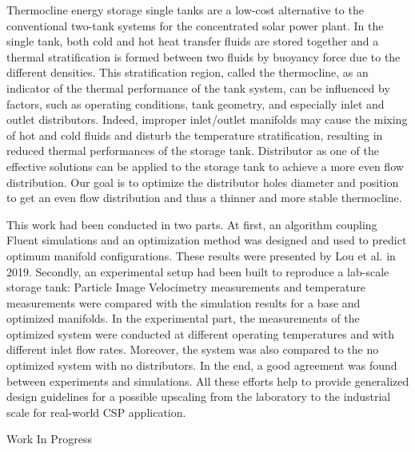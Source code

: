 {\normalsize
Thermocline energy storage single tanks are a low-cost alternative to the conventional two-tank systems for the concentrated solar power plant. In the single tank, both cold and hot heat transfer fluids are stored together and a thermal stratification is formed between two fluids by buoyancy force due to the different densities. This stratification region, called the thermocline, as an indicator of the thermal performance of the tank system, can be influenced by factors, such as operating conditions, tank geometry, and especially inlet and outlet distributors. Indeed, improper inlet/outlet manifolds may cause the mixing of hot and cold fluids and disturb the temperature stratification, resulting in reduced thermal performances of the storage tank. Distributor as one of the effective solutions can be applied to the storage tank to achieve a more even flow distribution. Our goal is to optimize the distributor holes diameter and position to get an even flow distribution and thus a thinner and more stable thermocline.



This work had been conducted in two parts. At first, an algorithm coupling Fluent simulations and an optimization method was designed and used to predict optimum manifold configurations. These results were presented by Lou et al. in 2019. Secondly, an experimental setup had been built to reproduce a lab-scale storage tank: Particle Image Velocimetry measurements and temperature measurements were compared with the simulation results for a base and optimized manifolds. In the experimental part, the measurements of the optimized system were conducted at different operating temperatures and with different inlet flow rates. Moreover, the system was also compared to the no optimized system with no distributors. In the end, a good agreement was found between experiments and simulations. All these efforts help to provide generalized design guidelines for a possible upscaling from the laboratory to the industrial scale for real-world CSP application.

 \vfill Work In Progress

}
 
